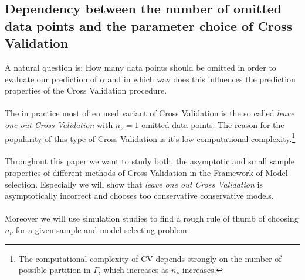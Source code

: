 \documentclass[Research_Module_ES.tex]{subfiles}
\begin{document}
\subsection{Dependency between the number of omitted data points and the  parameter choice of Cross Validation}
A natural question is: How many data points should be omitted in order to evaluate our prediction of $\alpha$ and in which way does this influences the prediction properties of the Cross Validation procedure.\\
\\
The in practice most often used variant of Cross Validation is the so called {\itshape leave one out Cross Validation} with $n_\nu=1$ omitted data points. The reason for the popularity of this type of Cross Validation is it's low computational complexity.\footnote{The computational complexity of CV depends strongly on the number of possible partition in $\Gamma$, which increases as $n_\nu$ increases.}\\
\\
Throughout this paper we want to study both, the asymptotic and small sample properties of different methods of Cross Validation in the Framework of Model selection. Especially we will show that {\itshape leave one out Cross Validation} is asymptotically incorrect and chooses too conservative conservative models.\\
\\
Moreover we will use simulation studies to find a rough rule of thumb of choosing $n_\nu$ for a given sample and model selecting problem.
\end{document}
